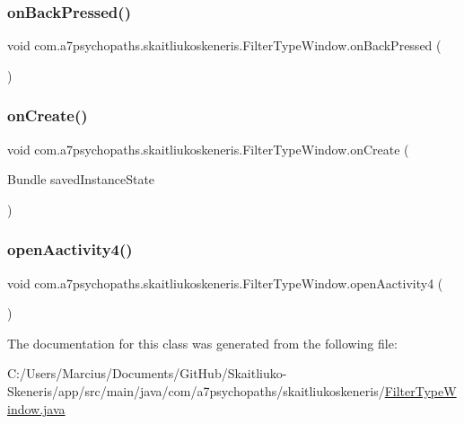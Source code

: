 \subsubsection{\texorpdfstring{on\+Back\+Pressed()}{onBackPressed()}}
{\footnotesize\ttfamily void com.\+a7psychopaths.\+skaitliukoskeneris.\+Filter\+Type\+Window.\+on\+Back\+Pressed (\begin{DoxyParamCaption}{ }\end{DoxyParamCaption})}

\mbox{\label{classcom_1_1a7psychopaths_1_1skaitliukoskeneris_1_1_filter_type_window_a89df8e35ff390e6f9399900e9c5027e1}} 
\subsubsection{\texorpdfstring{on\+Create()}{onCreate()}}
{\footnotesize\ttfamily void com.\+a7psychopaths.\+skaitliukoskeneris.\+Filter\+Type\+Window.\+on\+Create (\begin{DoxyParamCaption}\item[{Bundle}]{saved\+Instance\+State }\end{DoxyParamCaption})\hspace{0.3cm}{\ttfamily [protected]}}

\mbox{\label{classcom_1_1a7psychopaths_1_1skaitliukoskeneris_1_1_filter_type_window_a94490d46b463408319b90c6fa46e5c68}} 
\subsubsection{\texorpdfstring{open\+Aactivity4()}{openAactivity4()}}
{\footnotesize\ttfamily void com.\+a7psychopaths.\+skaitliukoskeneris.\+Filter\+Type\+Window.\+open\+Aactivity4 (\begin{DoxyParamCaption}{ }\end{DoxyParamCaption})}



The documentation for this class was generated from the following file\+:\begin{DoxyCompactItemize}
\item 
C\+:/\+Users/\+Marcius/\+Documents/\+Git\+Hub/\+Skaitliuko-\/\+Skeneris/app/src/main/java/com/a7psychopaths/skaitliukoskeneris/\mbox{\hyperlink{_filter_type_window_8java}{Filter\+Type\+Window.\+java}}\end{DoxyCompactItemize}
